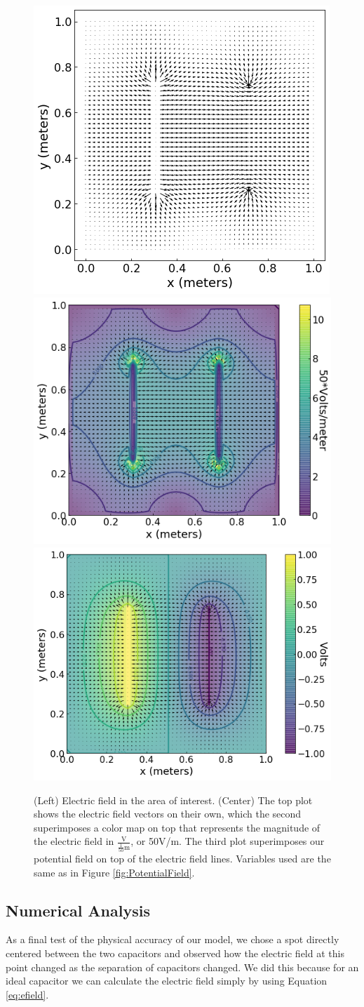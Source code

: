 \documentclass{report}
\begin{document}
            \begin{figure}[h]
                \centering
                \includegraphics[width=0.27\linewidth]{images/ElectricField.png}
                \includegraphics[width=0.32\linewidth]{images/ElectricFieldMagnitude.png}
                \includegraphics[width=0.34\linewidth]{images/ElectricFieldWithPotential.png}
                \caption{(Left) Electric field in the area of interest. (Center) The top plot shows the electric field vectors on their own, which the second superimposes a color map on top that represents the magnitude of the electric field in $\frac{\text{V}}{\frac{1}{50}\text{m}}$, or 50V/m. The third plot superimposes our potential field on top of the electric field lines. Variables used are the same as in Figure \ref{fig:PotentialField}.}
                \label{fig:ElectricField}
            \end{figure}
            
        \subsection{Numerical Analysis}

            As a final test of the physical accuracy of our model, we chose a spot directly centered between the two capacitors and observed how the electric field at this point changed as the separation of capacitors changed. We did this because for an ideal capacitor we can calculate the electric field simply by using Equation \ref{eq:efield}.
            
\end{document}
